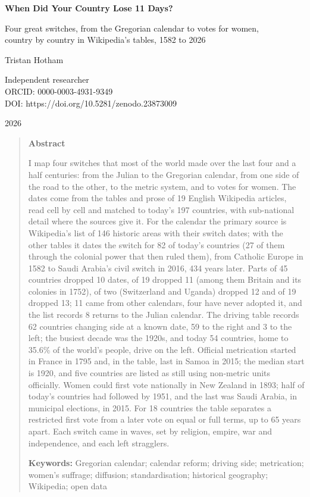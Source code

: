\documentclass[11pt,a4paper]{article}
\begin{document}
\begin{center}
{\Large\bfseries When Did Your Country Lose 11 Days?\par}
\vspace{0.4em}
{\large Four great switches, from the Gregorian calendar to votes for women,\\country by country in Wikipedia's tables, 1582 to 2026\par}
\vspace{1.2em}
{\large Tristan Hotham\par}
\vspace{0.3em}
{\small Independent researcher\\
ORCID: 0000-0003-4931-9349\\
DOI: https://doi.org/10.5281/zenodo.23873009\par}
\vspace{0.8em}
2026
\end{center}

\begin{quote}
\small
\begin{center}\textbf{Abstract}\end{center}
I map four switches that most of the world made over the last four and a half centuries: from the Julian to the Gregorian calendar, from one side of the road to the other, to the metric system, and to votes for women. The dates come from the tables and prose of 19 English Wikipedia articles, read cell by cell and matched to today's 197 countries, with sub-national detail where the sources give it. For the calendar the primary source is Wikipedia's list of 146 historic areas with their switch dates; with the other tables it dates the switch for 82 of today's countries (27 of them through the colonial power that then ruled them), from Catholic Europe in 1582 to Saudi Arabia's civil switch in 2016, 434 years later. Parts of 45 countries dropped 10 dates, of 19 dropped 11 (among them Britain and its colonies in 1752), of two (Switzerland and Uganda) dropped 12 and of 19 dropped 13; 11 came from other calendars, four have never adopted it, and the list records 8 returns to the Julian calendar. The driving table records 62 countries changing side at a known date, 59 to the right and 3 to the left; the busiest decade was the 1920s, and today 54 countries, home to 35.6\% of the world's people, drive on the left. Official metrication started in France in 1795 and, in the table, last in Samoa in 2015; the median start is 1920, and five countries are listed as still using non-metric units officially. Women could first vote nationally in New Zealand in 1893; half of today's countries had followed by 1951, and the last was Saudi Arabia, in municipal elections, in 2015. For 18 countries the table separates a restricted first vote from a later vote on equal or full terms, up to 65 years apart. Each switch came in waves, set by religion, empire, war and independence, and each left stragglers.

\textbf{Keywords:} Gregorian calendar; calendar reform; driving side; metrication; women's suffrage; diffusion; standardisation; historical geography; Wikipedia; open data
\end{quote}
\end{document}
